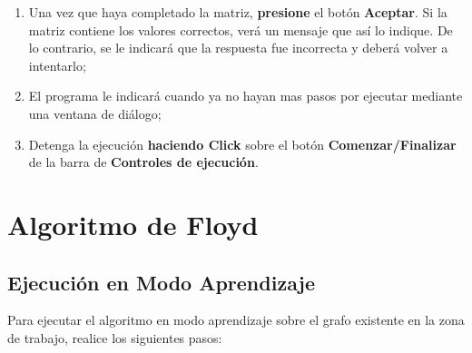 \documentclass{book}
\begin{document}
\begin{enumerate}
	\item Una vez que haya completado la matriz, \textbf{presione} el botón \textbf{Aceptar}. Si la matriz contiene los valores correctos, verá un mensaje que así lo indique. De lo contrario, se le indicará que la respuesta fue incorrecta y deberá volver a intentarlo;

	\item El programa le indicará cuando ya no hayan mas pasos por ejecutar mediante una ventana de diálogo;

	\item Detenga la ejecución \textbf{haciendo Click} sobre el botón \textbf{Comenzar/Finalizar} de la barra de \textbf{Controles de ejecución}.

\end{enumerate}
\medskip




%
%
\chapter{Algoritmo de Floyd}


\section{Ejecución en Modo Aprendizaje}

Para ejecutar el algoritmo en modo aprendizaje sobre el grafo existente en la zona de trabajo, realice los siguientes pasos:
\medskip
\end{document}
